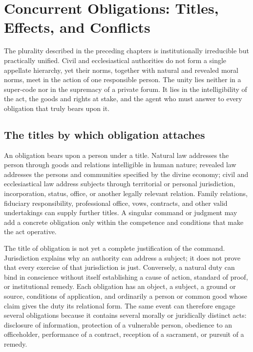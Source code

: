 \section{Concurrent Obligations: Titles, Effects, and Conflicts}

The plurality described in the preceding chapters is institutionally irreducible but practically unified. Civil and ecclesiastical authorities do not form a single appellate hierarchy, yet their norms, together with natural and revealed moral norms, meet in the action of one responsible person. The unity lies neither in a super-code nor in the supremacy of a private forum. It lies in the intelligibility of the act, the goods and rights at stake, and the agent who must answer to every obligation that truly bears upon it.

\subsection{The titles by which obligation attaches}

An obligation bears upon a person under a title. Natural law addresses the person through goods and relations intelligible in human nature; revealed law addresses the persons and communities specified by the divine economy; civil and ecclesiastical law address subjects through territorial or personal jurisdiction, incorporation, status, office, or another legally relevant relation. Family relations, fiduciary responsibility, professional office, vows, contracts, and other valid undertakings can supply further titles. A singular command or judgment may add a concrete obligation only within the competence and conditions that make the act operative.

The title of obligation is not yet a complete justification of the command. Jurisdiction explains why an authority can address a subject; it does not prove that every exercise of that jurisdiction is just. Conversely, a natural duty can bind in conscience without itself establishing a cause of action, standard of proof, or institutional remedy. Each obligation has an object, a subject, a ground or source, conditions of application, and ordinarily a person or common good whose claim gives the duty its relational form. The same event can therefore engage several obligations because it contains several morally or juridically distinct acts: disclosure of information, protection of a vulnerable person, obedience to an officeholder, performance of a contract, reception of a sacrament, or pursuit of a remedy.

